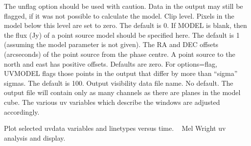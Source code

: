 {The unflag option should be used with caution. Data in the output
may still be flagged, if it was not possible to calculate the
model.
Clip level. Pixels in the model below this level are set to zero.
The default is 0.
If MODEL is blank, then the flux (Jy) of a point source model should
be specified here. The default is 1 (assuming the model parameter
is not given).
The RA and DEC offsets (arcseconds) of the point source from the phase
centre. A point source to the north and east has positive offsets.  
Defaults are zero.
For options=flag, UVMODEL flags those points in the output that
differ by more than ``sigma'' sigmas. The default is 100.
Output visibility data file name. No default. The output file will
contain only as many channels as there are planes in the model
cube. The various uv variables which describe the windows are
adjusted accordingly.
\par}
%
\noindent Plot selected uvdata variables and linetypes versus time.
\newline \
\newline {} Mel Wright
\newline {} uv analysis and display.
